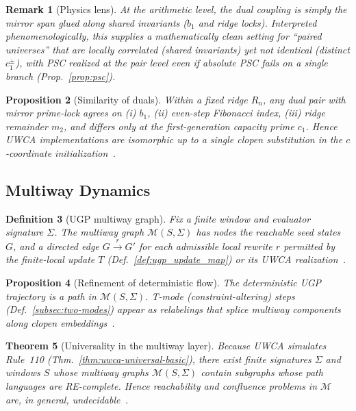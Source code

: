 \documentclass[12pt]{article}
\newtheorem{theorem}{Theorem}[section]
\newtheorem{proposition}[theorem]{Proposition}
\newtheorem{definition}[theorem]{Definition}
\newtheorem{remark}[theorem]{Remark}
\numberwithin{equation}{section}
\begin{document}
\begin{remark}[Physics lens]
At the arithmetic level, the dual coupling is simply the mirror span glued along shared invariants ($b_1$ and ridge locks). Interpreted phenomenologically, this supplies a mathematically clean setting for ``paired universes'' that are locally correlated (shared invariants) yet not identical (distinct $c_1^\pm$), with PSC realized at the pair level even if absolute PSC fails on a single branch (Prop.~\ref{prop:psc}).
\end{remark}

\begin{proposition}[Similarity of duals]\label{prop:similarity-duals}
Within a fixed ridge $R_n$, any dual pair with mirror prime-lock agrees on (i) $b_1$, (ii) even-step Fibonacci index, (iii) ridge remainder $m_2$, and differs only at the first-generation capacity prime $c_1$. Hence UWCA implementations are isomorphic up to a single clopen substitution in the $c$-coordinate initialization~\cite{SpivackUGPFormalization,ugp-lean}.
\end{proposition}

\subsection{Multiway Dynamics}\label{sec:multiway}

\begin{definition}[UGP multiway graph]\label{def:multiway}
Fix a finite window and evaluator signature $\Sigma$. The \emph{multiway graph} $\mathcal{M}(S,\Sigma)$ has nodes the reachable seed states $G$, and a directed edge
$G \xrightarrow{\;r\;} G'$
for each admissible local rewrite $r$ permitted by the finite-local update $T$ (Def.~\ref{def:ugp_update_map}) or its UWCA realization~\cite{SpivackUGPFormalization,ugp-lean}.
\end{definition}

\begin{proposition}[Refinement of deterministic flow]\label{prop:mw-refine}
The deterministic UGP trajectory is a path in $\mathcal{M}(S,\Sigma)$. T-mode (constraint-altering) steps (Def.~\ref{subsec:two-modes}) appear as \emph{relabelings} that splice multiway components along clopen embeddings~\cite{SpivackUGPFormalization,ugp-lean}.
\end{proposition}

\begin{theorem}[Universality in the multiway layer]\label{thm:mw-univ}
Because UWCA simulates Rule~110 (Thm.~\ref{thm:uwca-universal-basic}), there exist finite signatures $\Sigma$ and windows $S$ whose multiway graphs $\mathcal{M}(S,\Sigma)$ contain subgraphs whose path languages are RE-complete. Hence reachability and confluence problems in $\mathcal{M}$ are, in general, undecidable~\cite{SpivackUGPFormalization,ugp-lean}.
\end{theorem}
\end{document}
